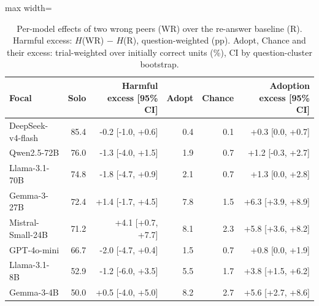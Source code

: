 \begin{table}[t]
\centering
\caption{Per-model effects of two wrong peers (WR) over the re-answer baseline (R). Harmful excess: $H$(WR) $-$ $H$(R), question-weighted (pp). Adopt, Chance and their excess: trial-weighted over initially correct units (\%), CI by question-cluster bootstrap.}
\label{tab:adoption}
\begin{adjustbox}{max width=\textwidth}
\small
\begin{tabular}{@{}lrrrrr@{}}
\toprule
Focal & Solo & Harmful excess [95\% CI] & Adopt & Chance & Adoption excess [95\% CI] \\
\midrule
DeepSeek-v4-flash & 85.4 & -0.2 [-1.0, +0.6] & 0.4 & 0.1 & +0.3 [0.0, +0.7] \\
Qwen2.5-72B & 76.0 & -1.3 [-4.0, +1.5] & 1.9 & 0.7 & +1.2 [-0.3, +2.7] \\
Llama-3.1-70B & 74.8 & -1.8 [-4.7, +0.9] & 2.1 & 0.7 & +1.3 [0.0, +2.8] \\
Gemma-3-27B & 72.4 & +1.4 [-1.7, +4.5] & 7.8 & 1.5 & +6.3 [+3.9, +8.9] \\
Mistral-Small-24B & 71.2 & +4.1 [+0.7, +7.7] & 8.1 & 2.3 & +5.8 [+3.6, +8.2] \\
GPT-4o-mini & 66.7 & -2.0 [-4.7, +0.4] & 1.5 & 0.7 & +0.8 [0.0, +1.9] \\
Llama-3.1-8B & 52.9 & -1.2 [-6.0, +3.5] & 5.5 & 1.7 & +3.8 [+1.5, +6.2] \\
Gemma-3-4B & 50.0 & +0.5 [-4.0, +5.0] & 8.2 & 2.7 & +5.6 [+2.7, +8.6] \\
\bottomrule
\end{tabular}
\end{adjustbox}
\end{table}

